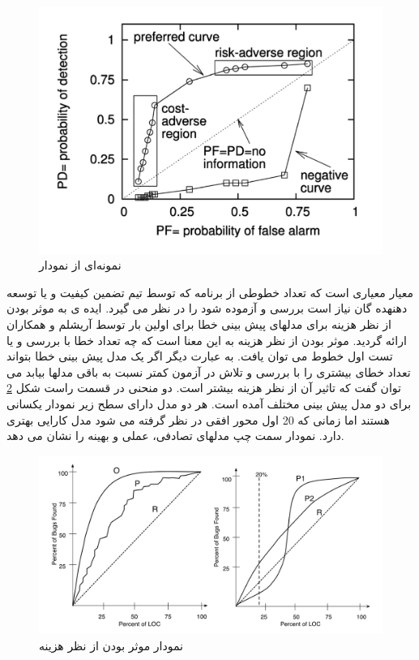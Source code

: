 \begin{figure}[H]
	\centering
	\includegraphics[width=.5\textwidth]{images/ROC.PNG}
	\caption{ نمونه‌ای از نمودار  \cite{menzies2007data}}
	\label{fig:ROC}
\end{figure}

معیار  معیاری است که تعداد خطوطی از برنامه که  توسط تیم تضمین کیفیت و یا توسعه دهنهده گان نیاز است بررسی و آزموده شود را در نظر می گیرد. ایده ی به موثر بودن از نظر هزینه 
برای مدلهای پیش بینی خطا برای اولین بار توسط آریشلم و همکاران \cite{arisholm2007data} ارائه گردید. موثر بودن از نظر هزینه به این معنا است که چه تعداد خطا با بررسی و یا تست   اول خطوط می توان یافت. به عبارت دیگر اگر یک مدل پیش بینی خطا بتواند تعداد خطای بیشتری را با بررسی و تلاش در آزمون کمتر نسبت به باقی مدلها بیابد می توان گفت که تاثیر آن از نظر هزینه بیشتر است. دو منحنی در  قسمت راست شکل \ref{fig:AUCEC} برای دو مدل پیش بینی مختلف آمده است. هر دو مدل دارای سطح زیر نمودار یکسانی هستند اما زمانی که 20\lr{\%}  اول محور افقی در نظر گرفته می شود مدل   کارایی بهتری دارد. نمودار سمت چپ مدلهای تصادفی، عملی و بهینه را نشان می دهد.

\begin{figure}[H]
	\centering
	\includegraphics[width=.7\textwidth]{images/AUCEC.PNG}
	\caption{ نمودار موثر بودن از نظر هزینه \cite{rahman2011bugcache}}
	\label{fig:AUCEC}
\end{figure}
